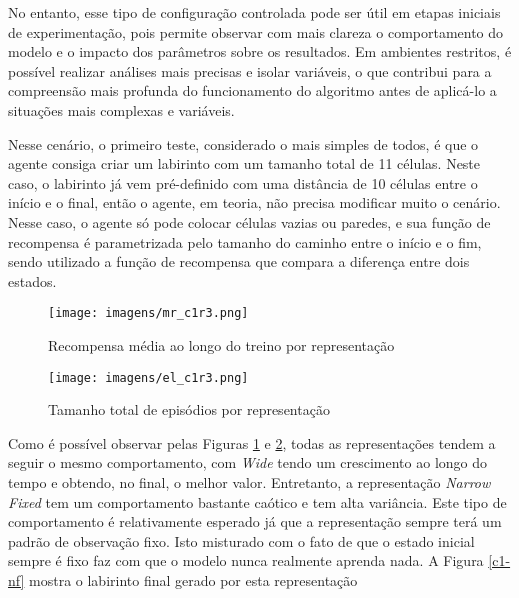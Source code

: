 No entanto, esse tipo de configuração controlada pode ser útil em etapas iniciais de experimentação, 
pois permite observar com mais clareza o comportamento do modelo e o impacto dos parâmetros sobre os resultados. 
Em ambientes restritos, é possível realizar análises mais precisas e isolar variáveis, o que contribui para a compreensão 
mais profunda do funcionamento do algoritmo antes de aplicá-lo a situações mais complexas e variáveis.


Nesse cenário, o primeiro teste, considerado o mais simples de todos, é que o agente 
consiga criar um labirinto com um tamanho total de 11 células. Neste caso, o labirinto já
vem pré-definido com uma distância de 10 células entre o início e o final, então o agente,
em teoria, não precisa modificar muito o cenário. Nesse caso, o agente só pode colocar 
células vazias ou paredes, e sua função de recompensa é parametrizada pelo tamanho 
do caminho entre o início e o fim, sendo utilizado a função de recompensa que compara
a diferença entre dois estados.

\begin{figure}[htb]
	\caption{\label{mr_c1r3}Recompensa média ao longo do treino por representação}
	\begin{center}
	    \texttt{[image: imagens/mr\_c1r3.png]}
	\end{center}
\end{figure}

\begin{figure}[htb]
	\caption{\label{el_c1r3}Tamanho total de episódios por representação}
	\begin{center}
	    \texttt{[image: imagens/el\_c1r3.png]}
	\end{center}
\end{figure}

\FloatBarrier

Como é possível observar pelas Figuras \ref{mr_c1r3} e \ref{el_c1r3}, todas as representações tendem a seguir o mesmo comportamento,
com \textit{Wide} tendo um crescimento ao longo do tempo e obtendo, no final, o melhor valor. Entretanto, a
representação \textit{Narrow Fixed} tem um comportamento bastante caótico e tem alta variância. Este tipo de
comportamento é relativamente esperado já que a representação sempre terá um padrão de observação fixo. Isto 
misturado com o fato de que o estado inicial sempre é fixo faz com que o modelo nunca realmente aprenda nada.
A Figura \ref{c1-nf} mostra o labirinto final gerado por esta representação

